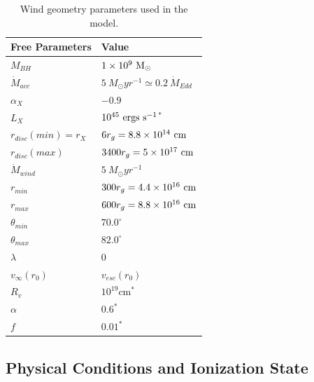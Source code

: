\documentclass[useAMS,usenatbib]{mn2e_x}
\begin{document}
\begin{table}
\begin{tabular}{p{3cm}p{4cm}}
\hline Free Parameters 	&	 Value \\ 
\hline \hline 
$M_{BH}$ 	 &	 $1\times 10^9~\rm{M_{\odot}}$ \\ 
$\dot{M}_{acc}$ 	 &	 $5~M_{\odot}yr^{-1} \simeq 0.2~\dot{M}_{Edd}$\\ 
$\alpha_X$ 	 &	 $-0.9$ \\ 
$L_{X} $ 	 &	 $10^{45}~\rm{ergs~s^{-1}}$$^*$ \\ 
$r_{disc}(min)=r_{X}$   &	 $6r_g=8.8\times10^{14}~{\rm cm}$ \\ 
$r_{disc}(max)$   &	 $3400r_g = 5\times10^{17}~{\rm cm}$ \\ 
$\dot{M}_{wind}$  &	 $5~M_{\odot}yr^{-1}$ \\ 
$r_{min}$ 	&	 $300r_{g} = 4.4\times10^{16}~{\rm cm}$\\ 
$r_{max}$ 	&	 $600r_{g} = 8.8\times10^{16}~{\rm cm}$ \\ 
$\theta_{min}$ 	&	 $70.0^{\circ}$ \\ 
$\theta_{max}$ 	&	 $82.0^{\circ}$ \\ 
$\lambda$ 	&	 $0$ \\ 
$v_{\infty}(r_0)$ 	&	 $v_{esc}(r_0)$ \\ 
$R_v$  	        &	 $10^{19}$cm$^*$ \\ 
$\alpha$ 	&	 $0.6^*$ \\
$f$ 	&	 $0.01^*$  \\
\hline 
\end{tabular}
\caption{Wind geometry parameters used in the model.}
\label{wind_param}
\end{table}



\subsection{Physical Conditions and Ionization State}
\end{document}

